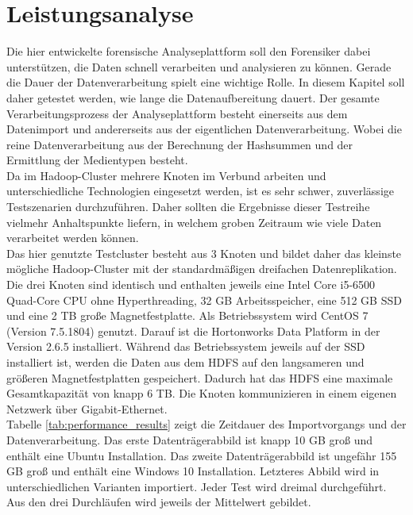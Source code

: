 \section{Leistungsanalyse}
\label{sec:performance_analysis}
Die hier entwickelte forensische Analyseplattform soll den Forensiker dabei unterstützen, die Daten schnell verarbeiten und analysieren zu können. Gerade die Dauer der Datenverarbeitung spielt eine wichtige Rolle. In diesem Kapitel soll daher getestet werden, wie lange die Datenaufbereitung dauert. Der gesamte Verarbeitungsprozess der Analyseplattform besteht einerseits aus dem Datenimport und andererseits aus der eigentlichen Datenverarbeitung. Wobei die reine Datenverarbeitung aus der Berechnung der Hashsummen und der Ermittlung der Medientypen besteht.\\
Da im Hadoop-Cluster mehrere Knoten im Verbund arbeiten und unterschiedliche Technologien eingesetzt werden, ist es sehr schwer, zuverlässige Testszenarien durchzuführen. Daher sollten die Ergebnisse dieser Testreihe vielmehr Anhaltspunkte liefern, in welchem groben Zeitraum wie viele Daten verarbeitet werden können.\\
Das hier genutzte Testcluster besteht aus 3 Knoten und bildet daher das kleinste mögliche Hadoop-Cluster mit der standardmäßigen dreifachen Datenreplikation. Die drei Knoten sind identisch und enthalten jeweils eine Intel Core i5-6500 Quad-Core CPU ohne Hyperthreading, 32 GB Arbeitsspeicher, eine 512 GB SSD und eine 2 TB große Magnetfestplatte. Als Betriebssystem wird CentOS 7 (Version 7.5.1804) genutzt. Darauf ist die Hortonworks Data Platform in der Version 2.6.5 installiert. Während das Betriebssystem jeweils auf der SSD installiert ist, werden die Daten aus dem HDFS auf den langsameren und größeren Magnetfestplatten gespeichert. Dadurch hat das HDFS eine maximale Gesamtkapazität von knapp 6 TB. Die Knoten kommunizieren in einem eigenen Netzwerk über Gigabit-Ethernet.\\  

\noindent
Tabelle \ref{tab:performance_results} zeigt die Zeitdauer des Importvorgangs und der Datenverarbeitung. Das erste Datenträgerabbild ist knapp 10 GB groß und enthält eine Ubuntu Installation. Das zweite Datenträgerabbild ist ungefähr 155 GB groß und enthält eine Windows 10 Installation. Letzteres Abbild wird in unterschiedlichen Varianten importiert. Jeder Test wird dreimal durchgeführt. Aus den drei Durchläufen wird jeweils der Mittelwert gebildet.\\

